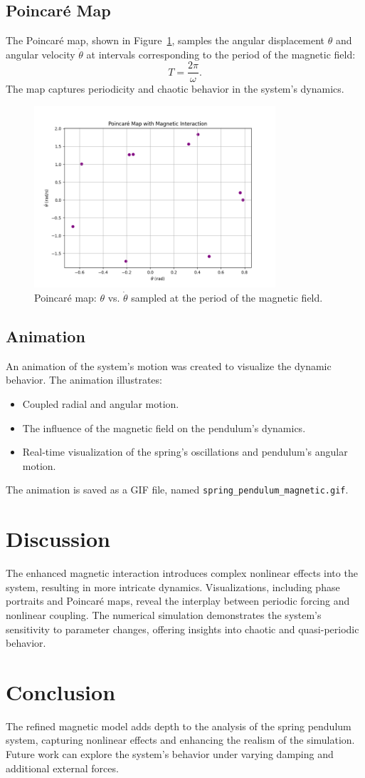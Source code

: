 \documentclass[12pt]{article}
\begin{document}
\subsection{Poincaré Map}
The Poincaré map, shown in Figure~\ref{fig:poincare_map_magnetic}, samples the angular displacement \( \theta \) and angular velocity \( \dot{\theta} \) at intervals corresponding to the period of the magnetic field:
\[
T = \frac{2\pi}{\omega}.
\]
The map captures periodicity and chaotic behavior in the system's dynamics.

\begin{figure}[h!]
    \centering
    \includegraphics[width=0.8\textwidth]{poincare_map_magnetic.png}
    \caption{Poincaré map: \( \theta \) vs. \( \dot{\theta} \) sampled at the period of the magnetic field.}
    \label{fig:poincare_map_magnetic}
\end{figure}

\subsection{Animation}
An animation of the system's motion was created to visualize the dynamic behavior. The animation illustrates:
\begin{itemize}
    \item Coupled radial and angular motion.
    \item The influence of the magnetic field on the pendulum's dynamics.
    \item Real-time visualization of the spring's oscillations and pendulum's angular motion.
\end{itemize}
The animation is saved as a GIF file, named \texttt{spring\_pendulum\_magnetic.gif}.

\section{Discussion}
The enhanced magnetic interaction introduces complex nonlinear effects into the system, resulting in more intricate dynamics. Visualizations, including phase portraits and Poincaré maps, reveal the interplay between periodic forcing and nonlinear coupling. The numerical simulation demonstrates the system's sensitivity to parameter changes, offering insights into chaotic and quasi-periodic behavior.

\section{Conclusion}
The refined magnetic model adds depth to the analysis of the spring pendulum system, capturing nonlinear effects and enhancing the realism of the simulation. Future work can explore the system's behavior under varying damping and additional external forces.
\end{document}
